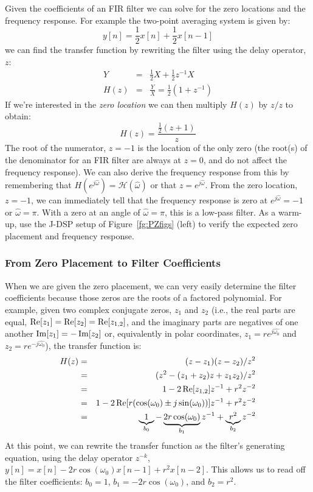 Given the coefficients of an FIR filter we can solve for the zero
locations and the frequency response.  For example the two-point
averaging system is given by:
\[
y[n] = \frac{1}{2}x[n] + \frac{1}{2}x[n-1]
\]
we can find the transfer function by rewriting the filter using the
delay operator, $z$:
\begin{eqnarray}
  Y    & = & \frac{1}{2} X + \frac{1}{2} z^{-1} X \\
  H(z) & = & \frac{Y}{X} = \frac{1}{2} (1 +  z^{-1})
\end{eqnarray}
If we're interested in the \emph{zero location} we can then multiply
$H(z)$ by $z/z$ to obtain:
\begin{equation}
  H(z) = \frac{\frac{1}{2} (z + 1)}{z}
\end{equation}
The root of the numerator, $z=-1$ is the location of the only zero
(the root(s) of the denominator for an FIR filter are always at $z=0$,
and do not affect the frequency response). We can also derive the frequency response from this by remembering that 
$H(e^{j\hat{\omega}})  = \mathcal{H}({\hat{\omega}})$ or that $z=e^{j\hat{\omega}}$. From the zero
location, $z=-1$, we can immediately tell that the frequency response is zero at $e^{j\hat{\omega}}=-1$ or 
$\hat{\omega}=\pi$. With a zero at an angle of
$\hat{\omega}=\pi$, this is a low-pass filter. As a warm-up, use the
J-DSP setup of Figure~\ref{fg:PZfigs} (left) to verify the expected zero
placement and frequency response.

\subsubsection{From Zero Placement to Filter Coefficients}

When we are given the zero placement, we can very easily determine the
filter coefficients because those zeros are the roots of a factored
polynomial. For example, given two complex conjugate zeros, $z_1$ and
$z_2$ (i.e., the real parts are equal, $\operatorname{Re}[z_{1}] = \operatorname{Re}[z_{2}] =
\operatorname{Re}[z_{1,2}] $, and the imaginary parts are negatives of one another
$ \operatorname{Im}[z_{1}] = -\operatorname{Im}[z_{2}] $ or, equivalently in polar
coordinates, $z_{1} = r e^{j\hat{\omega_0}}$ and $z_{2} = r
e^{-j\hat{\omega_0}}$), the transfer function is:
\begin{eqnarray}
  H(z) & = & (z - z_1)(z - z_2)/z^2 \\
  & = & (z^2 - (z_1 + z_2) z + z_1 z_2)/z^2 \\
  & = & 1 - 2 \operatorname{Re}[{z_{1,2}}] z^{-1} + r^2 z^{-2} \\
  & = & 1 - 2 \operatorname{Re}[r(\cos(\omega_0) \pm j\sin(\omega_0))] z^{-1} + r^2 z^{-2} \\
  & = & \underbrace{1}_{b_0} -\underbrace{2 r\cos(\omega_0)}_{b_1} z^{-1} + \underbrace{r^2}_{b_2} z^{-2}
\end{eqnarray}
At this point, we can rewrite the transfer function as the filter's
generating equation, using the delay operator $z^{-k}$, $y[n] = x[n] -
2 r\cos(\omega_0)x[n-1] + r^2 x[n-2]$. This allows us to read off the
filter coefficients: $b_0 = 1$, $b_1 = -2 r\cos(\omega_0)$, and $b_2 =
r^2$.

